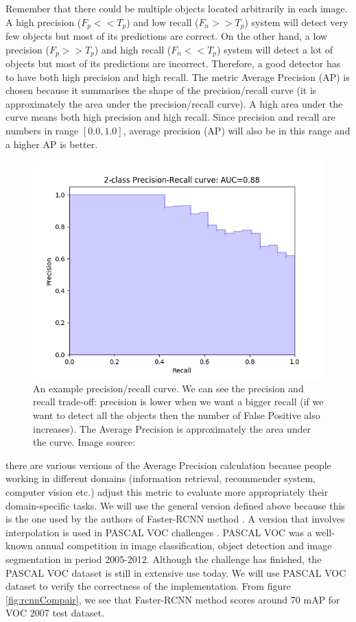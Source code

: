 Remember that there could be multiple objects located arbitrarily in each image. A high precision ($F_p << T_p$) and low recall ($F_n >> T_p$) system will detect very few objects but most of its predictions are correct. On the other hand, a low precision ($F_p >> T_p$) and high recall ($F_n << T_p$) system will detect a lot of objects but most of its predictions are incorrect. Therefore, a good detector has to have both high precision and high recall. The metric Average Precision (AP) is chosen because it summarises the shape of the precision/recall curve (it is approximately the area under the precision/recall curve). A high area under the curve means both high precision and high recall. Since precision and recall are numbers in range $[0.0, 1.0]$, average precision (AP) will also be in this range and a higher AP is better.

\begin{figure}[tb]
	\centering
	\includegraphics[width=0.9\hsize]{./figures/precRecal}
	\caption{An example precision/recall curve. We can see the precision and recall trade-off: precision is lower when we want a bigger recall (if we want to detect all the objects then the number of False Positive also increases). The Average Precision is approximately the area under the curve. Image source: \cite{scikit-learn-AP}}
	\label{fig:precRecal}
\end{figure}


 there are various versions of the Average Precision calculation because people working in different domains (information retrieval, recommender system, computer vision etc.) adjust this metric to evaluate more appropriately their domain-specific tasks. We will use the general version defined above because this is the one used by the authors of Faster-RCNN method \cite{vocEval}. A version \cite{Everingham2010} that involves interpolation is used in PASCAL VOC challenges \cite{Everingham2010}. PASCAL VOC was a well-known annual competition in image classification, object detection and image segmentation in period 2005-2012. Although the challenge has finished, the PASCAL VOC dataset is still in extensive use today. We will use PASCAL VOC dataset to verify the correctness of the implementation. From figure \ref{fig:rcnnCompair}, we see that Faster-RCNN method scores around 70 mAP for VOC 2007 test dataset.

